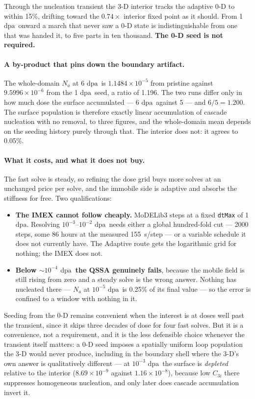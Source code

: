 \documentclass[11pt,a4paper]{article}
\newcommand{\code}[1]{\texttt{\small #1}}
\newcommand{\dpa}{\ensuremath{\mathrm{dpa}}}
\begin{document}
\noindent
Through the nucleation transient the 3-D interior tracks the adaptive 0-D to
within 15\%, drifting toward the $0.74\times$ interior fixed point as it should.
From 1 \dpa\ onward a march that never saw a 0-D state is indistinguishable from
one that was handed it, to five parts in ten thousand. \textbf{The 0-D seed is
not required.}

\paragraph{A by-product that pins down the boundary artifact.} The whole-domain
$N_a$ at 6 \dpa\ is $1.1484\times10^{-5}$ from pristine against
$9.5996\times10^{-6}$ from the 1 \dpa\ seed, a ratio of 1.196. The two runs
differ only in how much dose the surface accumulated --- 6 \dpa\ against 5 ---
and $6/5 = 1.200$. The surface population is therefore exactly linear
accumulation of cascade nucleation with no removal, to three figures, and the
whole-domain mean depends on the seeding history purely through that. The
interior does not: it agrees to 0.05\%.

\paragraph{What it costs, and what it does not buy.} The fast solve is steady,
so refining the dose grid buys more solves at an unchanged price per solve, and
the immobile side is adaptive and absorbs the stiffness for free. Two
qualifications:

\begin{itemize}
\item \textbf{The IMEX cannot follow cheaply.} MoDELib3 steps at a fixed
      \code{dtMax} of 1 \dpa. Resolving $10^{-3}$--$10^{-2}$ \dpa\ needs either a
      global hundred-fold cut --- 2000 steps, some 86 hours at the measured
      155~s/step --- or a variable schedule it does not currently have. The
      Adaptive route gets the logarithmic grid for nothing; the IMEX does
      not.
\item \textbf{Below $\sim10^{-4}$ \dpa\ the QSSA genuinely fails}, because the
      mobile field is still rising from zero and a steady solve is the wrong
      answer. Nothing has nucleated there --- $N_a$ at $10^{-5}$ \dpa\ is 0.25\%
      of its final value --- so the error is confined to a window with nothing
      in it.
\end{itemize}

\noindent
Seeding from the 0-D remains convenient when the interest is at doses well past
the transient, since it skips three decades of dose for four fast solves. But it
is a convenience, not a requirement, and it is the less defensible choice
whenever the transient itself matters: a 0-D seed imposes a spatially uniform
loop population the 3-D would never produce, including in the boundary shell
where the 3-D's own answer is qualitatively different --- at $10^{-3}$ \dpa\ the
surface is \emph{depleted} relative to the interior ($8.69\times10^{-9}$ against
$1.16\times10^{-8}$), because low $C_{3i}$ there suppresses homogeneous
nucleation, and only later does cascade accumulation invert it.
\end{document}
